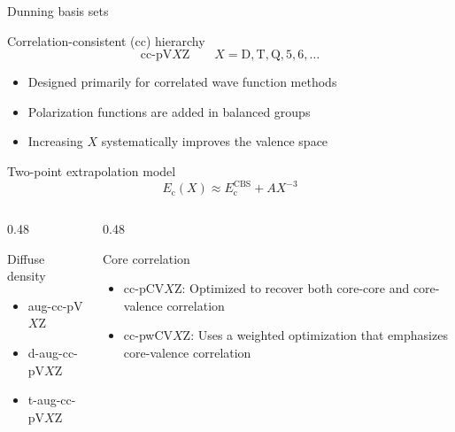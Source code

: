 \documentclass[aspectratio=169,9pt]{beamer}
\begin{document}
\begin{frame}{Dunning basis sets}
\small
			\begin{block}{Correlation-consistent (cc) hierarchy}
        		$$\boxed{\text{cc-pV}X\text{Z}}
        			\qquad
        			X=\mathrm{D,T,Q,5,6},\ldots$$
        		\begin{itemize}
        			\item Designed primarily for correlated wave function methods
        			\item Polarization functions are added in balanced groups
        			\item Increasing $X$ systematically improves the valence space
        		\end{itemize}
        	\end{block}
 			\begin{block}{Two-point extrapolation model}
 				\begin{equation*}
        			\boxed{E_{\mathrm{c}}(X)
        			\approx
        			E_{\mathrm{c}}^{\mathrm{CBS}} + A X^{-3}}
        		\end{equation*}
			\end{block}
	\begin{columns}[T,onlytextwidth]
		\begin{column}{0.48\textwidth}
			\begin{block}{Diffuse density}
				\begin{itemize}
					\item aug-cc-pV$X$Z
					\item d-aug-cc-pV$X$Z
					\item t-aug-cc-pV$X$Z
				\end{itemize}
			\end{block}
		\end{column}
		\begin{column}{0.48\textwidth}
			\begin{block}{Core correlation}
				\begin{itemize}
					\item cc-pCV$X$Z: Optimized to recover both core-core and core-valence correlation
					\item cc-pwCV$X$Z: Uses a weighted optimization that emphasizes core-valence correlation
				\end{itemize}
			\end{block}
		\end{column}
	\end{columns}
\end{frame}
\end{document}
